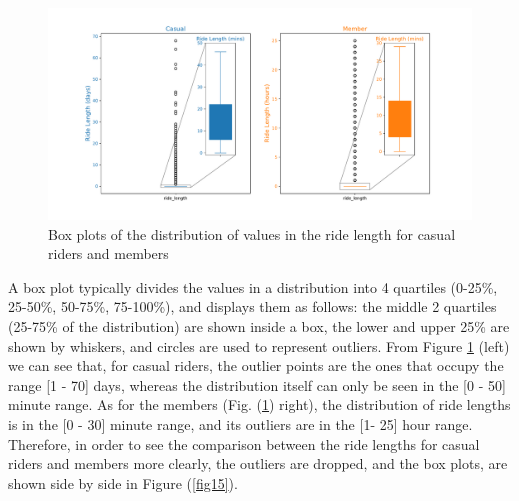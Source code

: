 \documentclass[12pt]{article}
\begin{document}
\begin{itemize}
\pagebreak
	\begin{figure}[h]
	\centering
	\includegraphics[scale=0.5]{boxplot_distribution.pdf} 
	\caption{Box plots of the distribution of values in the ride length for casual riders and members}
	\label{fig13}
	\end{figure}
	
A box plot typically divides the values in a distribution into 4 quartiles (0-25\%, 25-50\%, 50-75\%, 75-100\%), and displays them as follows: the middle 2 quartiles (25-75\% of the distribution) are shown inside a box, the lower and upper 25\% are shown by whiskers, and circles are used to represent outliers. From Figure \ref{fig13} (left) we can see that, for casual riders, the outlier points are the ones that occupy the range [1 - 70] days, whereas the distribution itself can only be seen in the [0 - 50] minute range. As for the members (Fig. (\ref{fig13}) right), the distribution of ride lengths is in the [0 - 30] minute range, and its outliers are in the [1- 25] hour range. Therefore, in order to see the comparison between the ride lengths for casual riders and members more clearly, the outliers are dropped, and the box plots, are shown side by side in Figure (\ref{fig15}). 


\end{itemize}
\end{document}
